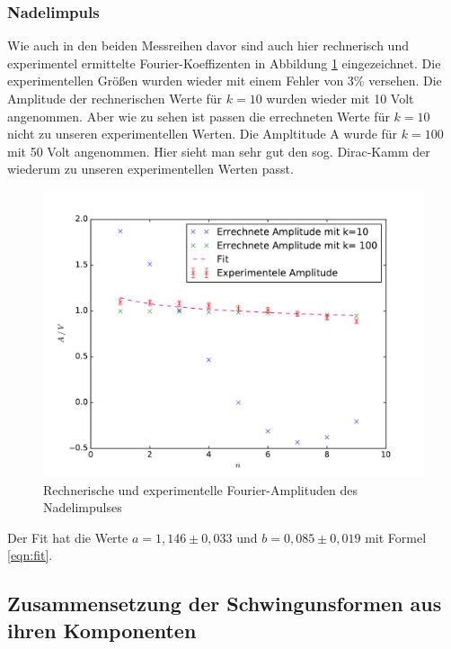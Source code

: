 \subsubsection{Nadelimpuls}
Wie auch in den beiden Messreihen davor sind auch hier rechnerisch und experimentel
ermittelte Fourier-Koeffizenten in Abbildung \ref{fig:np} eingezeichnet. Die experimentellen
Größen wurden wieder mit einem Fehler von 3\% versehen. Die Amplitude der rechnerischen Werte
für $ k = 10$ wurden wieder mit 10 Volt angenommen. Aber wie zu sehen ist passen die errechneten
Werte für $k = 10$ nicht zu unseren experimentellen Werten. Die Ampltitude A wurde für $k = 100$
mit 50 Volt angenommen. Hier sieht man sehr gut den sog. Dirac-Kamm der wiederum zu unseren
experimentellen Werten passt.
\begin{figure}
  \centering
  \includegraphics[width= \textwidth]{Plots/Nadelimpulsplot.pdf}
  \caption{Rechnerische und experimentelle Fourier-Amplituden des Nadelimpulses}
  \label{fig:np}
\end{figure}
\FloatBarrier
Der Fit hat die Werte $ a = 1,146 \pm 0,033 $ und $ b = 0,085 \pm 0,019$ mit Formel \eqref{eqn:fit}.

\subsection{Zusammensetzung der Schwingunsformen aus ihren Komponenten}
\label{sec:3.3}
